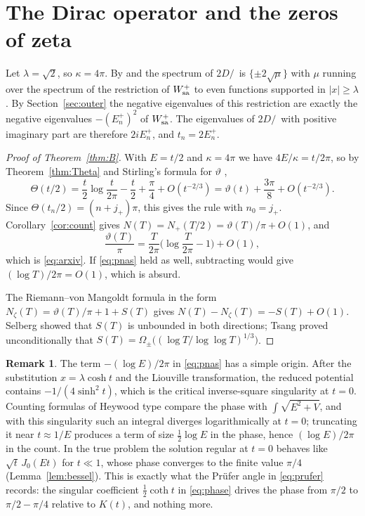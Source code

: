 \documentclass[11pt]{amsart}
\theoremstyle{definition}
\newtheorem{remark}[theorem]{Remark}
\newcommand{\Dslash}{D\!\!\!\!/\,}
\begin{document}
\section{The Dirac operator and the zeros of zeta}\label{sec:dirac}

Let $\lambda=\sqrt2$, so $\kappa=4\pi$. By \cite[Prop.~5.3]{CM21} and \cite[Prop.~4.3 and the proof of Thm.~5.1]{CM22} the spectrum of $2\Dslash$ is $\{\pm2\sqrt\mu\}$ with $\mu$ running over the spectrum of the restriction of $W_{\rm sa}^+$ to even functions supported in $|x|\ge\lambda$. By Section~\ref{sec:outer} the negative eigenvalues of this restriction are exactly the negative eigenvalues $-(E_n^+)^2$ of $W_{\rm sa}^+$. The eigenvalues of $2\Dslash$ with positive imaginary part are therefore $2iE_n^+$, and $t_n=2E_n^+$.

\begin{proof}[Proof of Theorem~\ref{thm:B}]
With $E=t/2$ and $\kappa=4\pi$ we have $4E/\kappa=t/2\pi$, so by Theorem~\ref{thm:Theta} and Stirling's formula for $\vartheta$ \cite[\S4.17]{Tit86},
\[
\Theta(t/2)=\frac t2\log\frac{t}{2\pi}-\frac t2+\frac\pi4+O(t^{-2/3})=\vartheta(t)+\frac{3\pi}{8}+O(t^{-2/3}).
\]
Since $\Theta(t_n/2)=(n+j_+)\pi$, this gives the rule with $n_0=j_+$. Corollary~\ref{cor:count} gives $N(T)=N_+(T/2)=\vartheta(T)/\pi+O(1)$, and
\[
\frac{\vartheta(T)}{\pi}=\frac{T}{2\pi}\Big(\log\frac{T}{2\pi}-1\Big)+O(1),
\]
which is \eqref{eq:arxiv}. If \eqref{eq:pnas} held as well, subtracting would give $(\log T)/2\pi=O(1)$, which is absurd.

The Riemann--von Mangoldt formula in the form $N_\zeta(T)=\vartheta(T)/\pi+1+S(T)$ \cite[\S9.3]{Tit86} gives $N(T)-N_\zeta(T)=-S(T)+O(1)$. Selberg showed that $S(T)$ is unbounded in both directions; Tsang \cite{Tsa86} proved unconditionally that $S(T)=\Omega_\pm\big((\log T/\log\log T)^{1/3}\big)$.
\end{proof}

\begin{remark}
The term $-(\log E)/2\pi$ in \eqref{eq:pnas} has a simple origin. After the substitution $x=\lambda\cosh t$ and the Liouville transformation, the reduced potential contains $-1/(4\sinh^2t)$, which is the critical inverse-square singularity at $t=0$. Counting formulas of Heywood type compare the phase with $\int\sqrt{E^2+V}$, and with this singularity such an integral diverges logarithmically at $t=0$; truncating it near $t\approx 1/E$ produces a term of size $\frac12\log E$ in the phase, hence $(\log E)/2\pi$ in the count. In the true problem the solution regular at $t=0$ behaves like $\sqrt t\,J_0(Et)$ for $t\ll1$, whose phase converges to the finite value $\pi/4$ (Lemma~\ref{lem:bessel}). This is exactly what the Pr\"ufer angle in \eqref{eq:prufer} records: the singular coefficient $\frac12\coth t$ in \eqref{eq:phase} drives the phase from $\pi/2$ to $\pi/2-\pi/4$ relative to $K(t)$, and nothing more.
\end{remark}
\end{document}
